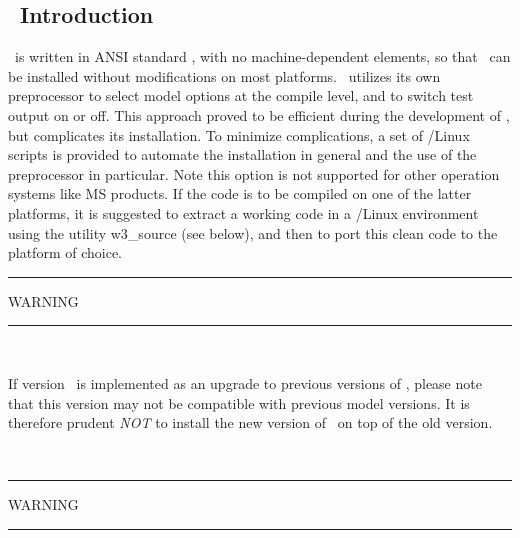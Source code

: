 \vssub
\subsection{~Introduction}
\vssub

\ws\ is written in ANSI standard , with no machine-dependent
elements, so that \ws\ can be installed without modifications on most
platforms. \ws\ utilizes its own preprocessor to select model options at the
compile level, and to switch test output on or off. This approach proved to be
efficient during the development of \ws, but complicates its installation. 
To minimize complications, a set of \unix/Linux scripts is provided to
automate the installation in general and the use of the preprocessor in
particular. 
Note this option is not supported for other operation systems like MS
products. If the code is to be compiled on one of the latter platforms, it is
suggested to extract a working code in a \unix/Linux environment using the
utility {\code w3\_source} (see below), and then to port this clean code to
the platform of choice.

\begin{center}
\rule[1mm]{55mm}{1.0mm} WARNING \rule[1mm]{55mm}{1.0mm} \\ 
\vspace{\baselineskip}
\parbox{120mm}{If version \WWver\ is implemented as an upgrade to previous
versions of \ws, please note that this version may not be compatible with
previous model versions. It is therefore prudent {\it NOT} to install the new
version of \ws\ on top of the old version.} \\ \vspace{\baselineskip}
\rule[1mm]{55mm}{1.0mm} WARNING \rule[1mm]{55mm}{1.0mm}
\end{center}
